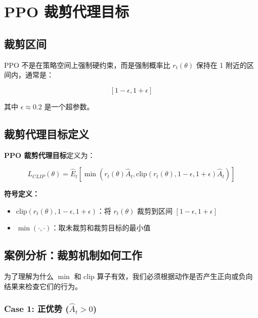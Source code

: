\documentclass[12pt,a4paper]{article}
\theoremstyle{noteplain}
\theoremstyle{noteexercise}
\begin{document}
\section{PPO 裁剪代理目标}\label{sec:clip}

\subsection{裁剪区间}

PPO 不是在策略空间上强制硬约束，而是强制概率比 $r_t(\theta)$ 保持在 1 附近的区间内，通常是：

\begin{equation}\label{eq:clip-interval}
  [1 - \epsilon, 1 + \epsilon]
\end{equation}

其中 $\epsilon \approx 0.2$ 是一个超参数。

\subsection{裁剪代理目标定义}

\textbf{PPO 裁剪代理目标}定义为：

\begin{equation}\label{eq:l-clip}
  L_{CLIP}(\theta) = \hat{E}_t\left[\min\left(r_t(\theta)\hat{A}_t, \text{clip}\left(r_t(\theta), 1-\epsilon, 1+\epsilon\right)\hat{A}_t\right)\right]
\end{equation}

\textbf{符号定义：}
\begin{itemize}
  \setlength{\itemsep}{0.2em}
  \item $\text{clip}(r_t(\theta), 1-\epsilon, 1+\epsilon)$：将 $r_t(\theta)$ 裁剪到区间 $[1-\epsilon, 1+\epsilon]$
  \item $\min(\cdot, \cdot)$：取未裁剪和裁剪目标的最小值
\end{itemize}

\subsection{案例分析：裁剪机制如何工作}

为了理解为什么 $\min$ 和 $\text{clip}$ 算子有效，我们必须根据动作是否产生正向或负向结果来检查它们的行为。

\subsubsection{Case 1: 正优势 ($\hat{A}_t > 0$)}
\end{document}
